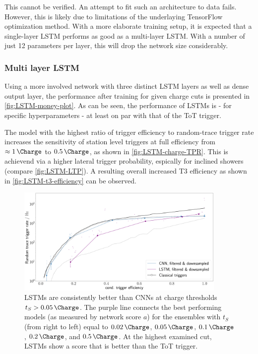 This cannot be verified. An attempt to fit such an architecture to data fails. However, this is likely due to limitations of the underlaying TensorFlow 
optimization method. With a more elaborate training setup, it is expected that a single-layer LSTM performs as good as a multi-layer LSTM. With a number of just 12
parameters per layer, this will drop the network size considerably.

\subsubsection{Multi layer LSTM}
\label{sssec:multi-layer-lsmt}

Using a more involved network with three distinct LSTM layers as well as dense output layer, the performance after training for given charge cuts is presented in
\autoref{fig:LSTM-money-plot}. As can be seen, the performance of LSTMs is - for specific hyperparameters - at least on par with that of the ToT trigger.

The model with the highest ratio of trigger efficiency to random-trace trigger rate increases the sensitivity of station level triggers at full efficiency from 
$\approx\SI{1}{\Charge}$ to $\SI{0.5}{\Charge}$, as shown in \autoref{fig:LSTM-charge-TPR}. This is achievend via a higher lateral trigger probability, espically
for inclined showers (compare \autoref{fig:LSTM-LTP}). A resulting overall increased T3 efficiency as shown in \autoref{fig:LSTM-t3-efficiency} can be observed.

\begin{figure}
	\centering
	\includegraphics[width=0.9\textwidth]{./plots/LSTM_money_plot.png}
	\caption{LSTMs are consistently better than CNNs at charge thresholds $t_S > \SI{0.05}{\Charge}$. The purple line connects the best performing models (as 
	measured by network score $a$) for the ensembles with $t_S$ (from right to left) equal to $\SI{0.02}{\Charge}$, $\SI{0.05}{\Charge}$, $\SI{0.1}{\Charge}$,
	$\SI{0.2}{\Charge}$, and $\SI{0.5}{\Charge}$. At the highest examined cut, LSTMs show a score that is better than the ToT trigger.}
	\label{fig:LSTM-money-plot}
\end{figure}

